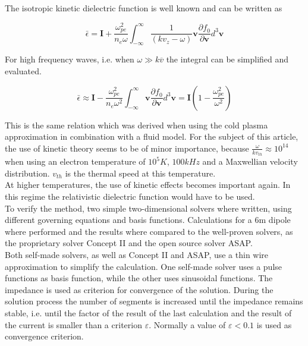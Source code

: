 \documentclass[two-coloumn,ras]{agutex}
\begin{document}
\begin{article}
The isotropic kinetic dielectric function is well known and can be written as

\begin{equation}
\bar{\epsilon} =\mathbf{I} +  \frac{\omega_{pe}^2}{n_e  \omega}  \int_{-\infty}^{\infty} \frac{1}{ (k  v_z-\omega)}\mathbf{v} \frac{\partial f_0}{\partial \mathbf{v}} d^3 \mathbf{v}
\end{equation}

For high frequency waves, i.e. when $\omega \gg k\overline{v}$ the integral can be simplified and evaluated.

\begin{equation}
\bar{\epsilon} \approx \mathbf{I} -  \frac{\omega_{pe}^2}{n_e  \omega^2}  \int_{-\infty}^{\infty} \mathbf{v} \frac{\partial f_0}{\partial \mathbf{v}} d^3 \mathbf{v}=\mathbf{I}\left( 1 -  \frac{\omega_{pe}^2}{  \omega^2}\right)
\end{equation}

This is the same relation which was derived when using the cold plasma approximation in combination with a fluid model. For the subject of this article, the use of kinetic theory seems to be of minor importance, because $\frac{\omega}{kv_{th}}\approx 10^{14}$ when using an electron temperature of $10^5K$, $100kHz$ and a Maxwellian velocity distribution. $v_{th}$ is the thermal speed at this temperature. \\

At higher temperatures, the use of kinetic effects becomes important again. In this regime the relativistic dielectric function would have to be used. \\

To verify the method, two simple two-dimensional solvers where written, using different governing equations and basis functions. Calculations for a 6m dipole where performed and the results where compared to the well-proven solvers, as the proprietary solver Concept II and the open source solver ASAP.\\

Both self-made solvers, as well as Concept II and ASAP, use a thin wire approximation to simplify the calculation. One self-made solver uses a pulse functions as basis function, while the other uses sinusoidal functions. The impedance is used as criterion for convergence of the solution. During the solution process the number of segments is increased until the impedance remains stable, i.e. until the factor of the result of the last calculation and the result of the current is smaller than a criterion $\varepsilon$. Normally a value of $\varepsilon < 0.1$ is used as convergence criterion.\\



\end{article}
\end{document}

